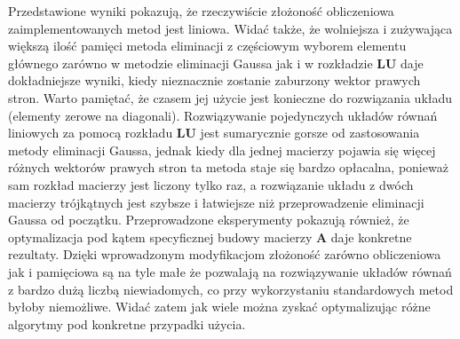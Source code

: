 \documentclass{mk-polish-lab-report}
\newcommand{\mA}{\bm{A}}
\newcommand{\mL}{\bm{L}}
\newcommand{\mU}{\bm{U}}
\begin{document}
Przedstawione wyniki pokazują, że rzeczywiście złożoność obliczeniowa zaimplementowanych metod jest liniowa. Widać także, że wolniejsza i zużywająca większą ilość pamięci metoda eliminacji z częściowym wyborem elementu głównego zarówno w metodzie eliminacji Gaussa jak i w rozkładzie $\mL\mU$ daje dokładniejsze wyniki, kiedy nieznacznie zostanie zaburzony wektor prawych stron. Warto pamiętać, że czasem jej użycie jest konieczne do rozwiązania układu (elementy zerowe na diagonali). Rozwiązywanie pojedynczych układów równań liniowych za pomocą rozkładu $\mL\mU$ jest sumarycznie gorsze od zastosowania metody eliminacji Gaussa, jednak kiedy dla jednej macierzy pojawia się więcej różnych wektorów prawych stron ta metoda staje się bardzo opłacalna, ponieważ sam rozkład macierzy jest liczony tylko raz, a rozwiązanie układu z dwóch macierzy trójkątnych jest szybsze i łatwiejsze niż przeprowadzenie eliminacji Gaussa od początku. Przeprowadzone eksperymenty pokazują również, że optymalizacja pod kątem specyficznej budowy macierzy $\mA$ daje konkretne rezultaty. Dzięki wprowadzonym modyfikacjom złożoność zarówno obliczeniowa jak i pamięciowa są na tyle małe że pozwalają na rozwiązywanie układów równań z bardzo dużą liczbą niewiadomych, co przy wykorzystaniu standardowych metod byłoby niemożliwe. Widać zatem jak wiele można zyskać optymalizując różne algorytmy pod konkretne przypadki użycia.
\end{document}
